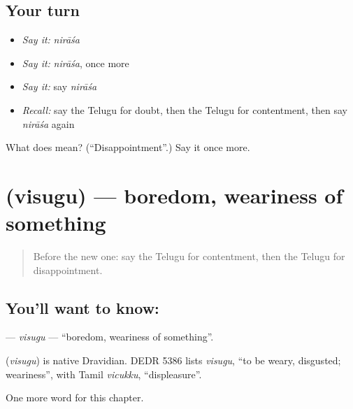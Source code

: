 \subsection*{Your turn}
\begin{itemize}
\raggedright
  \item \emph{Say it:} \emph{nirāśa}
  \item \emph{Say it:} \emph{nirāśa}, once more
  \item \emph{Say it:} say \emph{nirāśa}
  \item \emph{Recall:} say the Telugu for doubt, then the Telugu for contentment, then say \emph{nirāśa} again
\end{itemize}

\begin{tcolorbox}[breakable,colback=teal!4,colframe=teal!35!black,title={Before you move on}]
What does  mean? (\textquotedblleft{}Disappointment\textquotedblright{}.) Say it once more.
\end{tcolorbox}
\section[\texorpdfstring{\te{విసుగు} (visugu)}{విసుగు (visugu)}]{ (visugu) — boredom, weariness of something}

\label{lesson:TE-C210-visugu}



\begin{quote}
Before the new one: say the Telugu for contentment, then the Telugu for disappointment.
\end{quote}

\subsection*{You'll want to know: }
\textbf{} — \emph{visugu} — \textquotedblleft{}boredom, weariness of something\textquotedblright{}.

\begin{cousinweb}
\textbf{} (\emph{visugu}) is native Dravidian. DEDR 5386 lists \emph{visugu}, \textquotedblleft{}to be weary, disgusted; weariness\textquotedblright{}, with Tamil \emph{vicukku}, \textquotedblleft{}displeasure\textquotedblright{}.
\end{cousinweb}

\begin{grammarlens}[title={What you've built}]
One more word for this chapter.
\end{grammarlens}

